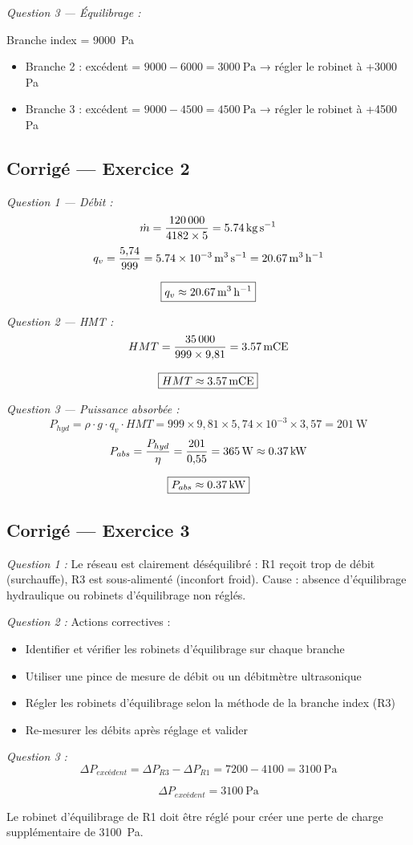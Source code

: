 \textit{Question 3 — Équilibrage :}

Branche index = \SI{9000}{\pascal}
\begin{itemize}
  \item Branche 2 : excédent = $9000 - 6000 = \SI{3000}{\pascal}$ → régler le robinet à +3000\,Pa
  \item Branche 3 : excédent = $9000 - 4500 = \SI{4500}{\pascal}$ → régler le robinet à +4500\,Pa
\end{itemize}


\subsection*{Corrigé — Exercice 2}

\textit{Question 1 — Débit :}
\[
  \dot{m} = \frac{120\,000}{4182 \times 5} = \SI{5{,}74}{\kilogram\per\second}
\]
\[
  q_v = \frac{5{,}74}{999} = \SI{5{,}74e-3}{\cubic\metre\per\second} = \SI{20{,}67}{\cubic\metre\per\hour}
\]

\[
  \boxed{q_v \approx \SI{20{,}67}{\cubic\metre\per\hour}}
\]

\textit{Question 2 — HMT :}
\[
  HMT = \frac{35\,000}{999 \times 9{,}81} = \SI{3{,}57}{mCE}
\]

\[
  \boxed{HMT \approx \SI{3{,}57}{mCE}}
\]

\textit{Question 3 — Puissance absorbée :}
\[
  P_{hyd} = \rho \cdot g \cdot q_v \cdot HMT = 999 \times 9{,}81 \times 5{,}74 \times 10^{-3} \times 3{,}57 = \SI{201}{\watt}
\]
\[
  P_{abs} = \frac{P_{hyd}}{\eta} = \frac{201}{0{,}55} = \SI{365}{\watt} \approx \SI{0{,}37}{\kilo\watt}
\]

\[
  \boxed{P_{abs} \approx \SI{0{,}37}{\kilo\watt}}
\]


\subsection*{Corrigé — Exercice 3}

\textit{Question 1 :} Le réseau est clairement déséquilibré : R1 reçoit trop de débit (surchauffe), R3 est sous-alimenté (inconfort froid). Cause : absence d'équilibrage hydraulique ou robinets d'équilibrage non réglés.

\textit{Question 2 :} Actions correctives :
\begin{itemize}
  \item Identifier et vérifier les robinets d'équilibrage sur chaque branche
  \item Utiliser une pince de mesure de débit ou un débitmètre ultrasonique
  \item Régler les robinets d'équilibrage selon la méthode de la branche index (R3)
  \item Re-mesurer les débits après réglage et valider
\end{itemize}

\textit{Question 3 :}
\[
  \Delta P_{excédent} = \Delta P_{R3} - \Delta P_{R1} = 7200 - 4100 = \SI{3100}{\pascal}
\]

\[
  \boxed{\Delta P_{excédent} = \SI{3100}{\pascal}}
\]

Le robinet d'équilibrage de R1 doit être réglé pour créer une perte de charge supplémentaire de \SI{3100}{\pascal}.
